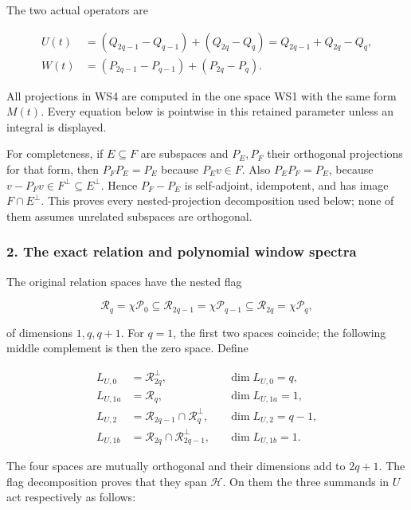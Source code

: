 The two actual operators are

\[
\begin{aligned}
U(t)&=(Q_{2q-1}-Q_{q-1})+(Q_{2q}-Q_q)
     =Q_{2q-1}+Q_{2q}-Q_q,\\
W(t)&=(P_{2q-1}-P_{q-1})+(P_{2q}-P_q).
\end{aligned}
\tag{WS4}
\]

All projections in WS4 are computed in the one space WS1 with the same form \(M(t)\). Every equation below is pointwise in this retained parameter unless an integral is displayed.

For completeness, if \(E\subseteq F\) are subspaces and \(P_E,P_F\) their orthogonal projections for that form, then \(P_FP_E=P_E\) because \(P_Ev\in F\). Also \(P_E P_F=P_E\), because \(v-P_Fv\in F^\perp\subseteq E^\perp\). Hence \(P_F-P_E\) is self-adjoint, idempotent, and has image \(F\cap E^\perp\). This proves every nested-projection decomposition used below; none of them assumes unrelated subspaces are orthogonal.

\subsubsection{2. The exact relation and polynomial window spectra}\label{endpoint-window_review--the-exact-relation-and-polynomial-window-spectra}

The original relation spaces have the nested flag

\[
\mathcal R_q=\chi\mathcal P_0
\subseteq\mathcal R_{2q-1}=\chi\mathcal P_{q-1}
\subseteq\mathcal R_{2q}=\chi\mathcal P_q,
\tag{WS5}
\]

of dimensions \(1,q,q+1\). For \(q=1\), the first two spaces coincide; the following middle complement is then the zero space. Define

\[
\begin{aligned}
L_{U,0}&=\mathcal R_{2q}^{\perp},\qquad &&\dim L_{U,0}=q,\\
L_{U,1a}&=\mathcal R_q, &&\dim L_{U,1a}=1,\\
L_{U,2}&=\mathcal R_{2q-1}\cap\mathcal R_q^{\perp},
&&\dim L_{U,2}=q-1,\\
L_{U,1b}&=\mathcal R_{2q}\cap\mathcal R_{2q-1}^{\perp},
&&\dim L_{U,1b}=1.
\end{aligned}
\tag{WS6}
\]

The four spaces are mutually orthogonal and their dimensions add to \(2q+1\). The flag decomposition proves that they span \(\mathcal H\). On them the three summands in \(U\) act respectively as follows:

